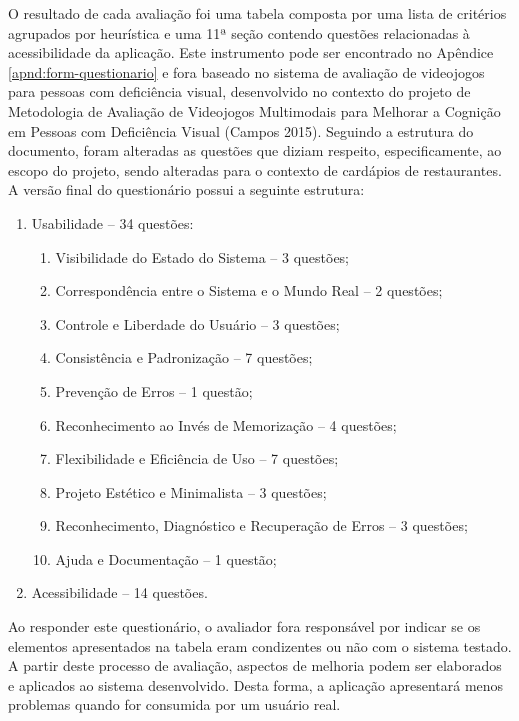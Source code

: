 O resultado de cada avaliação foi uma tabela composta por uma lista de critérios agrupados por heurística e uma 11ª seção contendo questões relacionadas à acessibilidade da aplicação. Este instrumento pode ser encontrado no Apêndice \ref{apnd:form-questionario} e fora baseado no sistema de avaliação de videojogos para pessoas com deficiência visual, desenvolvido no contexto do projeto de Metodologia de Avaliação de Videojogos Multimodais para Melhorar a Cognição em Pessoas com Deficiência Visual (Campos 2015)\nocite{CAMPOS2015}. Seguindo a estrutura do documento, foram alteradas as questões que diziam respeito, especificamente, ao escopo do projeto, sendo alteradas para o contexto de cardápios de restaurantes. A versão final do questionário possui a seguinte estrutura:
\begin{enumerate}
	\item Usabilidade -- 34 questões:
	\begin{enumerate}[label*={\arabic*}]
		\item Visibilidade do Estado do Sistema -- 3 questões;
		\item Correspondência entre o Sistema e o Mundo Real -- 2 questões;
		\item Controle e Liberdade do Usuário -- 3 questões;
		\item Consistência e Padronização -- 7 questões;
		\item Prevenção de Erros -- 1 questão;
		\item Reconhecimento ao Invés de Memorização -- 4 questões;
		\item Flexibilidade e Eficiência de Uso -- 7 questões;
		\item Projeto Estético e Minimalista -- 3 questões;
		\item Reconhecimento, Diagnóstico e Recuperação de Erros -- 3 questões;
		\item Ajuda e Documentação -- 1 questão;
	\end{enumerate}
	\item Acessibilidade -- 14 questões.
\end{enumerate}

Ao responder este questionário, o avaliador fora responsável por indicar se os elementos apresentados na tabela eram condizentes ou não com o sistema testado. A partir deste processo de avaliação, aspectos de melhoria podem ser elaborados e aplicados ao sistema desenvolvido. Desta forma, a aplicação apresentará menos problemas quando for consumida por um usuário real.

